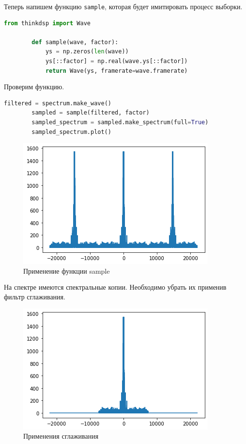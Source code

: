 \documentclass[a4paper, 14pt]{extarticle}
\begin{document}
    Теперь напишем функцию \texttt{sample}, которая будет имитировать процесс выборки.

    \begin{lstlisting}[language=Python, caption= Функция sample, label={lst:sample}]
        from thinkdsp import Wave

        def sample(wave, factor):
            ys = np.zeros(len(wave))
            ys[::factor] = np.real(wave.ys[::factor])
            return Wave(ys, framerate=wave.framerate)
    \end{lstlisting}

    Проверим функцию.

    \begin{lstlisting}[language=Python, caption= Применения sample, label={lst:apply_sample}]
        filtered = spectrum.make_wave()
        sampled = sample(filtered, factor)
        sampled_spectrum = sampled.make_spectrum(full=True)
        sampled_spectrum.plot()
    \end{lstlisting}

    \begin{figure}[H]
        \centering
        \includegraphics[width=0.8\linewidth]{drum_sample}
        \caption{Применение функции sample}
        \label{fig:drum_sample}
    \end{figure}

    На спектре имеются спектральные копии.
    Необходимо убрать их применив фильтр сглаживания.

    \begin{figure}[H]
        \centering
        \includegraphics[width=0.8\linewidth]{drum_sample_after_filter}
        \caption{Применения сглаживания}
        \label{fig:drum_sample_after_filter}
    \end{figure}
\end{document}
